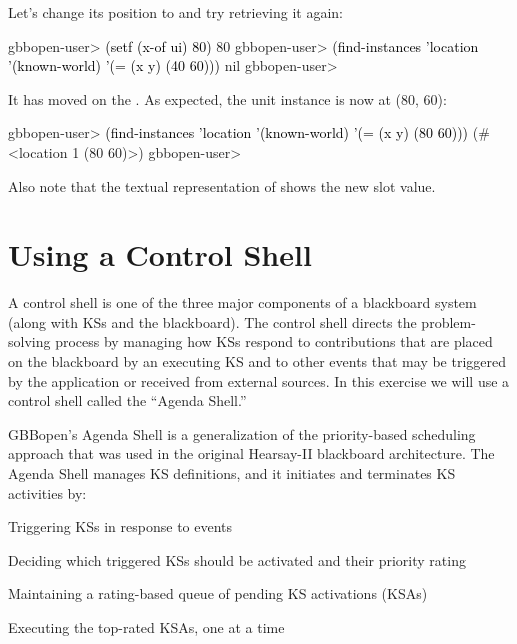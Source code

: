 \documentclass[10pt,twoside,english,pdftex]{article}
\begin{document}
%
%
Let's change its  position to  and try retrieving it again:
%
\W\supp
\begin{example}
\textcolor{darkergray}{%
  gbbopen-user> \textcolor{black}{(setf (x-of ui) 80)}
  80
  gbbopen-user> \textcolor{black}{(find-instances 'location '(known-world)
                  '(= (x y) (40 60)))}
  nil
  gbbopen-user>}
\end{example}
%
It has moved on the .  As expected, the
  unit instance is now at (80, 60):
%
\W\supp\notpretop
\begin{example}
\textcolor{darkergray}{%
  gbbopen-user> \textcolor{black}{(find-instances 'location '(known-world)
                  '(= (x y) (80 60)))}
  (#<location 1 (80 60)>)
  gbbopen-user>}
\end{example}
%
Also note that the textual representation of  
shows the new  slot value.


\T\markright{}%
\T\pagestyle{plain}
\T\cleardoublepage
\W{}
\T\pagestyle{fancy}
\T\thispagestyle{fancybottom}
\T\renewcommand{\headrulewidth}{0pt}
\section{Using a Control Shell}
\label{sec:control-shell}%

A control shell is one of the three major components of a blackboard system
(along with KSs and the blackboard).  The control shell directs the
problem-solving process by managing how KSs respond to contributions that are
placed on the blackboard by an executing KS and to other events that may be
triggered by the application or received from external sources.  In this
exercise we will use a control shell called the ``Agenda Shell.''

GBBopen's Agenda Shell is a generalization of the priority-based scheduling
approach that was used in the original Hearsay-II blackboard architecture.
The Agenda Shell manages KS definitions, and it initiates and terminates KS
activities by:
%
\begin{tightitemize}
\item Triggering KSs in response to events
\item Deciding which triggered KSs should be activated and their priority
  rating
\item Maintaining a rating-based queue of pending KS activations (KSAs)
\item Executing the top-rated KSAs, one at a time
\end{tightitemize}
\end{document}
